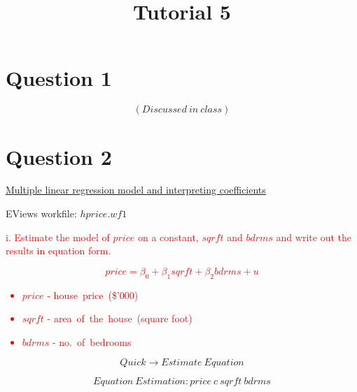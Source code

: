 \documentclass[12pt]{report}
\title{Tutorial 5}
\subtitle
{
	\textbf{keywords}: estimators, unbiasedness, expected value, variance, multiple linear regression, interpretation, ceteris paribus, prediction, interpretation, R squared
	
	\textbf{estimated reading time}: 30 minutes
}
\begin{document}
	
\maketitle

\newpage
\section*{Question 1}
$$(Discussed\ in\ class)$$

\newpage
\section*{Question 2}
\underline{Multiple linear regression model and interpreting coefficients}

\noindent EViews workfile: $hprice.wf1$
\begin{figure}[H]
	\centering
\end{figure}
\vspace{-\baselineskip}
\noindent \textcolor{red}
{
	i. Estimate the model of $price$ on a constant, $sqrft$ and $bdrms$ and write out the results in equation form.
}
\noindent \textcolor{red}{$$price = \beta_0 + \beta_1sqrft + \beta_2bdrms + u$$ \begin{itemize}
		\item $price$ - house\ price\ (\$'000)
		\item $sqrft$ - area\ of\ the\ house\ (square foot)
		\item $bdrms$ - no.\ of\ bedrooms
\end{itemize}} \vspace{-\baselineskip}
$$Quick \to Estimate\ Equation$$
\begin{figure}[H]
	\centering
\end{figure}
\vspace{-\baselineskip}
$$Equation\ Estimation: price\ c\ sqrft\ bdrms$$
\begin{figure}[H]
	\centering
\end{figure}
\vspace{-\baselineskip}
\end{document}
